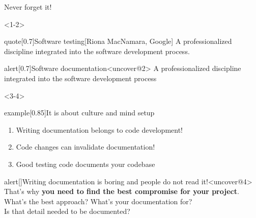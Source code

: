 \begin{frame}{Never forget it!}
    \begin{onlyenv}<1-2>
        \begin{varblock*}{quote}[0.7\textwidth]{Software testing}[Riona MacNamara, Google]
             A professionalized discipline integrated into the software development process.
        \end{varblock*}
        \vspace{3mm}
        \begin{varblock}{alert}[0.7\textwidth]{Software documentation}<uncover@2>
             A professionalized discipline integrated into the software development process
        \end{varblock}
    \end{onlyenv}
    \begin{onlyenv}<3-4>
        \begin{varblock*}{example}[0.85\textwidth]{It is about culture and mind setup}
            \begin{enumerate}
                \item Writing documentation belongs to code development!
                \item Code changes can invalidate documentation!
                \item Good testing code documents your codebase
            \end{enumerate}
        \end{varblock*}
        \vspace{3mm}
        \begin{varblock}{alert}[\textwidth]{Writing documentation is boring and people do not read it!}<uncover@4>
            That's why \textbf{you need to find the best compromise for your project}.\\[1mm]
            What's the best approach?
            What's your documentation for?\\
            Is that detail needed to be documented?
        \end{varblock}
    \end{onlyenv}
\end{frame}
